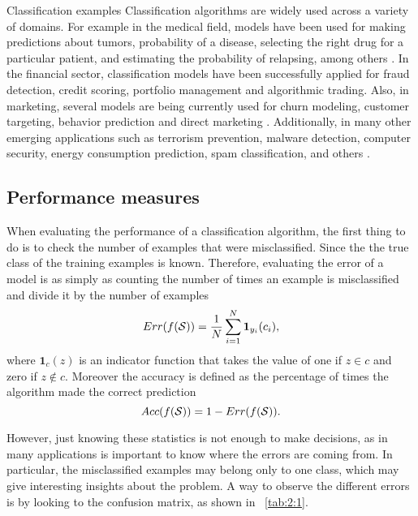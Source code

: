 \begin{remark}{Classification examples}
Classification algorithms are widely used across a variety of domains. For example in the 
medical field, models have been used for making predictions about tumors, probability 
of a disease, selecting the right drug for a particular patient, and estimating the probability of 
relapsing, among others \citep{Herland2014}. In the financial sector, classification models have 
been successfully applied for fraud detection, credit scoring, portfolio management and algorithmic 
trading. Also, in marketing, several models are being currently used for churn modeling, customer 
targeting, behavior prediction and direct marketing \citep{Baesens2014}. Additionally, in many 
other emerging applications such as terrorism prevention, malware detection, computer security, 
energy consumption prediction, spam classification, and others \citep{Kriegel2007}.
\end{remark}


\subsection{Performance measures}

When evaluating the performance of a classification algorithm, the first thing to do is to check 
the number of examples that were misclassified. Since the the true class of the training examples 
is known. Therefore, evaluating the error of a model is as simply as counting the number of times 
an example is misclassified and divide it by the number of examples
\begin{equation}\label{eqn:ch2:error}
Err(f({\cal S})) = \frac{1}{N}  \sum_{i=1}^N \mathbf{1}_{y_i}(c_i),
\end{equation}
where $\mathbf{1}_c(z)$ is an indicator function that takes the value of one if $z \in c$ and 
zero if $z \notin c$. Moreover the accuracy is defined as the percentage of times the algorithm 
made the correct prediction
\begin{equation}\label{eqn:2:accuracy}
Acc(f({\cal S})) = 1- Err(f({\cal S})).
\end{equation}

However, just knowing these statistics is not enough to make decisions, as in many applications is 
important to know where the errors are coming from. In particular, the misclassified examples may 
belong only to one class, which may give interesting insights about the problem. A way to observe 
the different errors is by looking to the confusion matrix, as shown in \tablename{~\ref{tab:2:1}}. 

